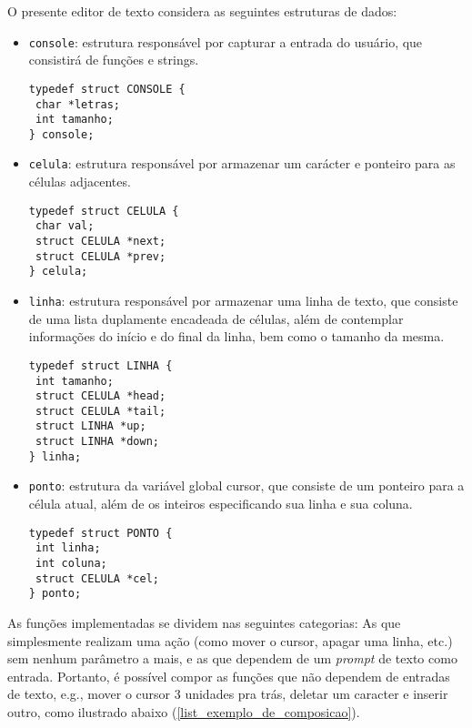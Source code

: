 \documentclass[a4paper, 11pt]{article}
\begin{document}
O presente editor de texto considera as seguintes estruturas de dados:
\begin{itemize}%
\item \texttt{console}: estrutura responsável por capturar a entrada do usuário, que consistirá de funções e strings.

\begin{lstlisting}[name=console,
language={[ansi]C},
frame=trBL,
firstnumber=1]
typedef struct CONSOLE {
 char *letras;
 int tamanho;
} console;
\end{lstlisting}
\item \texttt{celula}: estrutura responsável por armazenar um carácter e ponteiro para as células adjacentes.
\begin{lstlisting}[name=console,
language={[ansi]C},
frame=trBL,
firstnumber=1]
typedef struct CELULA {
 char val;
 struct CELULA *next;
 struct CELULA *prev;
} celula;
\end{lstlisting}
\item \texttt{linha}: estrutura responsável por armazenar uma linha de texto, que consiste de uma lista duplamente encadeada de células, além de contemplar informações do início e do final da linha, bem como o tamanho da mesma.
\begin{lstlisting}[name=console,
language={[ansi]C},
frame=trBL,
firstnumber=1]
typedef struct LINHA {
 int tamanho;
 struct CELULA *head;
 struct CELULA *tail;
 struct LINHA *up;
 struct LINHA *down;
} linha;
\end{lstlisting}
\item \texttt{ponto}: estrutura da variável global cursor, que consiste de um ponteiro para a célula atual, além de os inteiros especificando sua linha e sua coluna. 
\begin{lstlisting}[name=console,
language={[ansi]C},
frame=trBL,
firstnumber=1]
typedef struct PONTO {
 int linha;
 int coluna;
 struct CELULA *cel;
} ponto;
\end{lstlisting}
\end{itemize}

As funções implementadas se dividem nas seguintes categorias: As que simplesmente realizam uma ação (como mover o cursor, apagar uma linha, etc.) sem nenhum parâmetro a mais, e as que dependem de um \textit{prompt} de texto como entrada. Portanto, é possível compor as funções que não dependem de entradas de texto, e.g., mover o cursor 3 unidades pra trás, deletar um caracter e inserir outro, como ilustrado abaixo (\ref{list_exemplo_de_composicao}).
\end{document}
